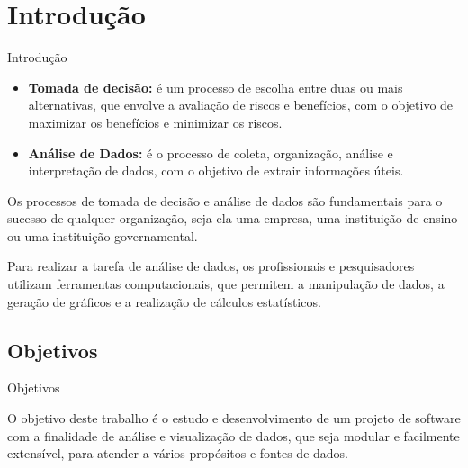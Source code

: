 

\section{Introdução}
\label{sec:introducao}

\begin{frame}{Introdução}

	\begin{itemize}
		\item \textbf{Tomada de decisão:} é um processo de escolha entre duas ou mais alternativas, que envolve a avaliação de riscos e benefícios, com o objetivo de maximizar os benefícios e minimizar os riscos.
		\item \textbf{Análise de Dados:} é o processo de coleta, organização, análise e interpretação de dados, com o objetivo de extrair informações úteis.
	\end{itemize}

	\bigskip

	\setlength{\leftskip}{3cm}

	\quad Os processos de tomada de decisão e análise de dados são fundamentais para o sucesso de qualquer organização, seja ela uma empresa, uma instituição de ensino ou uma instituição governamental.

	\medskip

	\quad Para realizar a tarefa de análise de dados, os profissionais e pesquisadores utilizam ferramentas computacionais, que permitem a manipulação de dados, a geração de gráficos e a realização de cálculos estatísticos.

	\setlength{\leftskip}{0pt}


\end{frame}

\subsection{Objetivos}
\label{subsec:objetivos}

\begin{frame}{Objetivos}

	\quad O objetivo deste trabalho é o estudo e desenvolvimento de um projeto de software com a finalidade de análise e visualização de dados, que seja modular e facilmente extensível, para atender a vários propósitos e fontes de dados.

\end{frame}

